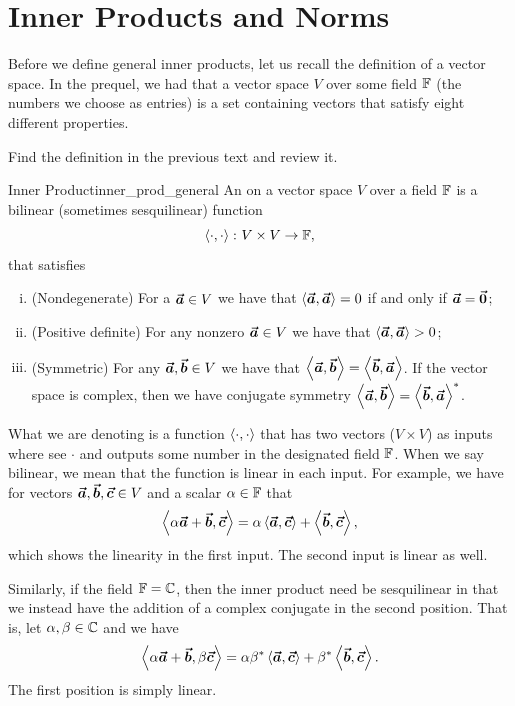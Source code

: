 \section{Inner Products and Norms}

Before we define general inner products, let us recall the definition of a vector space.  In the prequel, we had that a vector space $V$ over some field $\mathbb{F}$ (the numbers we choose as entries) is a set containing vectors that satisfy eight different properties.

\begin{exercise}
	Find the definition in the previous text and review it.
\end{exercise}

\begin{df}{Inner Product}{inner_prod_general}
An  on a vector space $V$ over a field $\mathbb{F}$ is a bilinear (sometimes sesquilinear) function
\[
\left\langle \cdot, \cdot \right\rangle \colon V \times V \to \mathbb{F},
\]
that satisfies
\begin{enumerate}[i.]
	\item (Nondegenerate) For a $\boldsymbol{\vec{a}}\in V$ we have that $\left\langle \boldsymbol{\vec{a}}, \boldsymbol{\vec{a}} \right\rangle =0$ if and only if $\boldsymbol{\vec{a}}=\boldsymbol{\vec{0}}$;
	\item (Positive definite) For any nonzero $\boldsymbol{\vec{a}} \in V$ we have that $\left\langle \boldsymbol{\vec{a}}, \boldsymbol{\vec{a}} \right\rangle > 0$;
	\item (Symmetric) For any $\boldsymbol{\vec{a}},\boldsymbol{\vec{b}}\in V$ we have that $\left\langle \boldsymbol{\vec{a}}, \boldsymbol{\vec{b}} \right\rangle = \left\langle \boldsymbol{\vec{b}}, \boldsymbol{\vec{a}} \right\rangle$. If the vector space is complex, then we have conjugate symmetry $\left\langle \boldsymbol{\vec{a}}, \boldsymbol{\vec{b}} \right\rangle=\left\langle \boldsymbol{\vec{b}}, \boldsymbol{\vec{a}} \right\rangle^*$.
\end{enumerate}
What we are denoting is a function $\left\langle \cdot, \cdot \right\rangle$ that has two vectors ($V\times V$) as inputs where see $\cdot$ and outputs some number in the designated field $\mathbb{F}$. When we say bilinear, we mean that the function is linear in each input. For example, we have for vectors $\boldsymbol{\vec{a}},\boldsymbol{\vec{b}},\boldsymbol{\vec{c}}\in V$ and a scalar $\alpha \in \mathbb{F}$ that
\[
\left\langle \alpha\boldsymbol{\vec{a}} + \boldsymbol{\vec{b}}, \boldsymbol{\vec{c}} \right\rangle = \alpha \left\langle \boldsymbol{\vec{a}}, \boldsymbol{\vec{c}} \right\rangle + \left\langle \boldsymbol{\vec{b}}, \boldsymbol{\vec{c}} \right\rangle,
\]
which shows the linearity in the first input.  The second input is linear as well.

Similarly, if the field $\mathbb{F}=\mathbb{C}$, then the inner product need be sesquilinear in that we instead have the addition of a complex conjugate in the second position. That is, let $\alpha,\beta\in \mathbb{C}$ and we have
\[
\left\langle \alpha\boldsymbol{\vec{a}} + \boldsymbol{\vec{b}}, \beta\boldsymbol{\vec{c}} \right\rangle = \alpha \beta^*\left\langle \boldsymbol{\vec{a}}, \boldsymbol{\vec{c}} \right\rangle + \beta^*\left\langle \boldsymbol{\vec{b}}, \boldsymbol{\vec{c}} \right\rangle.
\]
The first position is simply linear.
\end{df}

